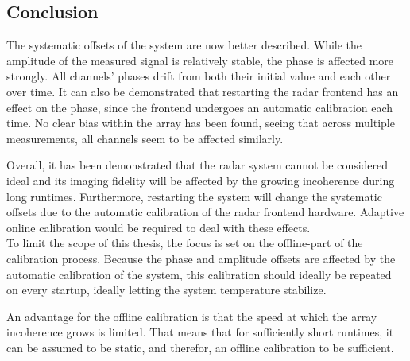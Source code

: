 \subsection{Conclusion}
The systematic offsets of the system are now better described.
While the amplitude of the measured signal is relatively stable, the phase is affected more strongly.
All channels' phases drift from both their initial value and each other over time.
It can also be demonstrated that restarting the radar frontend has an effect on the phase, since the frontend undergoes an automatic calibration each time.
No clear bias within the array has been found, seeing that across multiple measurements, all channels seem to be affected similarly.

Overall, it has been demonstrated that the radar system cannot be considered ideal and
its imaging fidelity will be affected by the growing incoherence during long runtimes.
Furthermore, restarting the system will change the systematic offsets due to the automatic calibration of the radar frontend hardware.
Adaptive online calibration would be required to deal with these effects. \\

To limit the scope of this thesis, the focus is set on the offline-part of the calibration process.
Because the phase and amplitude offsets are affected by the automatic calibration of the system,
this calibration should ideally be repeated on every startup, ideally letting the system temperature stabilize.

An advantage for the offline calibration is that the speed at which the array incoherence grows is limited.
That means that for sufficiently short runtimes, it can be assumed to be static, and therefor, an offline calibration to be sufficient.